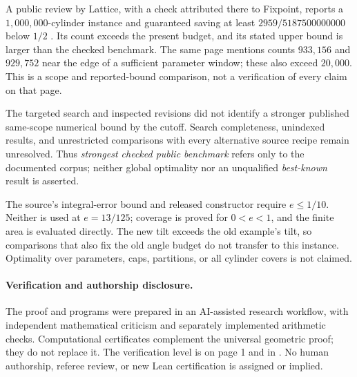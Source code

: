 \documentclass[11pt]{article}
\begin{document}
A public review by Lattice, with a check attributed there to Fixpoint,
reports a \(1{,}000{,}000\)-cylinder instance and guaranteed saving at least
\(2959/5187500000000\) below \(1/2\) \cite{lattice}.
Its count exceeds the present budget, and its stated upper bound is
larger than the checked benchmark. The same page mentions counts
\(933{,}156\) and \(929{,}752\) near the edge of a sufficient parameter
window; these also exceed \(20{,}000\).
This is a scope and reported-bound comparison, not a verification of
every claim on that page.

The targeted search and inspected revisions did not identify a stronger
published same-scope numerical bound by the cutoff.
Search completeness, unindexed results, and unrestricted comparisons
with every alternative source recipe remain unresolved.
Thus \emph{strongest checked public benchmark} refers only to the
documented corpus; neither global optimality nor an unqualified
\emph{best-known} result is asserted.

The source's integral-error bound and released constructor require
\(e\le1/10\). Neither is used at \(e=13/125\); coverage is proved for
\(0<e<1\), and the finite area is evaluated directly.
The new tilt exceeds the old example's tilt, so comparisons that also
fix the old angle budget do not transfer to this instance.
Optimality over parameters, caps, partitions, or all cylinder covers
is not claimed.

\paragraph{Verification and authorship disclosure.}
The proof and programs were prepared in an AI-assisted research workflow,
with independent mathematical criticism and separately implemented
arithmetic checks. Computational certificates complement the universal
geometric proof; they do not replace it.
The verification level is on page 1 and in .
No human authorship, referee review, or new Lean certification is assigned
or implied.

\begingroup
\small\raggedright


\endgroup
\end{document}
